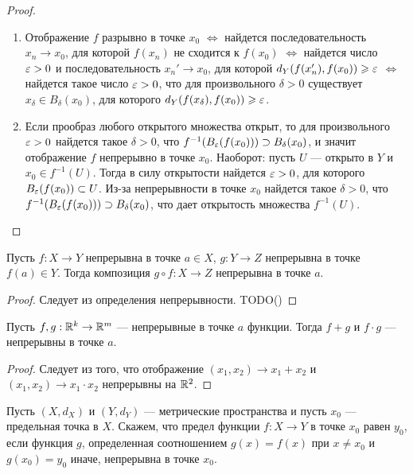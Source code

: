 \documentclass[a4paper]{article}
\theoremstyle{named}
\begin{document}
    \begin{proof}
        ~

        \begin{enumerate}
        \item
            Отображение $f$ разрывно в точке $x_0$ $\iff$ найдется последовательность $x_n \to x_0$, для которой $f(x_n)$ не сходится к $f(x_0)$ $\iff$ найдется число $\varepsilon > 0$ и последовательность $x_n' \to x_0$, для которой $d_Y(f(x_n'), f(x_0)) \geqslant \varepsilon$ $\iff$ найдется такое число $\varepsilon > 0$, что для произвольного $\delta > 0$ существует $x_{\delta} \in B_{\delta}(x_0)$, для которого $d_Y(f(x_\delta), f(x_0)) \geqslant \varepsilon$.

        \item
            Если прообраз любого открытого множества открыт, то для произвольного $\varepsilon > 0$ найдется такое $\delta > 0$, что $f^{-1}(B_{\varepsilon}(f(x_0))) \supset B_{\delta}(x_0)$, и значит отображение $f$ непрерывно в точке $x_0$. Наоборот: пусть $U$ --- открыто в $Y$ и $x_0 \in f^{-1}(U)$. Тогда в силу открытости найдется $\varepsilon > 0$, для которого $B_{\varepsilon}(f(x_0)) \subset U$. Из-за непрерывности в точке $x_0$ найдется такое $\delta > 0$, что $f^{-1}(B_{\varepsilon}(f(x_0))) \supset B_{\delta}(x_0)$, что дает открытость множества $f^{-1}(U)$.
        \end{enumerate} 
    \end{proof}

    \begin{proposal*}
        Пусть $f: X \to Y$ непрерывна в точке $a \in X$, $g: Y \to Z$ непрерывна в точке $f(a) \in Y$. Тогда композиция $g \circ f: X \to Z$ непрерывна в точке $a$.
    \end{proposal*}

    \begin{proof}
        Следует из определения непрерывности. TODO()
    \end{proof}

    \begin{consequence*}
        Пусть $f, g: \mathbb{R}^k \to \mathbb{R}^m$ --- непрерывные в точке $a$ функции. Тогда $f + g$ и $f \cdot g$ --- непрерывны в точке $a$.
    \end{consequence*}

    \begin{proof}
        Следует из того, что отображение $(x_1, x_2) \to x_1 + x_2$ и $(x_1, x_2) \to x_1 \cdot x_2$ непрерывны на $\mathbb{R}^2$.
    \end{proof}

    \begin{definition*}
        Пусть $(X, d_X)$ и $(Y, d_Y)$ --- метрические пространства и пусть $x_0$ --- предельная точка в $X$. Скажем, что предел функции $f: X \to Y$ в точке $x_0$ равен $y_0$, если функция $g$, определенная соотношением $g(x) = f(x)$ при $x \neq x_0$ и $g(x_0) = y_0$ иначе, непрерывна в точке $x_0$.
    \end{definition*}
        
\end{document}
